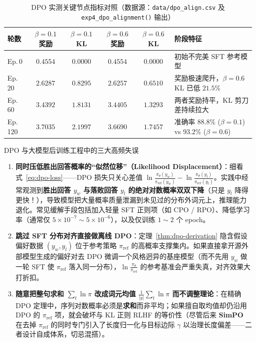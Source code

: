 \begin{table}[htbp]
\centering
\caption{DPO 实测关键节点指标对照（数据源：\texttt{data/dpo\_align.csv} 及 \texttt{exp4\_dpo\_alignment()} 输出）}
\label{tab:dpo-metrics}
\footnotesize
\begin{tabularx}{\linewidth}{@{}lccccX@{}}
\toprule
\textbf{轮数} & \textbf{$\beta{=}0.1$ 奖励} & \textbf{$\beta{=}0.1$ KL} & \textbf{$\beta{=}0.6$ 奖励} & \textbf{$\beta{=}0.6$ KL} & \textbf{阶段特征} \\
\midrule
Ep.\,0   & $0.4554$ & $0.0000$ & $0.4554$ & $0.0000$ & 初始不完美 SFT 参考模型 \\
Ep.\,20  & $2.6287$ & $0.8295$ & $2.6257$ & $0.6510$ & 奖励极速爬升，$\beta{=}0.6$ KL 已低 $21.5\%$ \\
Ep.\,60  & $3.4392$ & $1.8131$ & $3.4405$ & $1.3293$ & 两者奖励持平，KL 剪刀差持续拉大 \\
Ep.\,120 & $3.7035$ & $2.1997$ & $3.6690$ & $1.7457$ & 准确率 $88.8\%$ ($\beta{=}0.1$) vs $93.2\%$ ($\beta{=}0.6$) \\
\bottomrule
\end{tabularx}
\end{table}

\begin{failBox}{DPO 与大模型后训练工程中的三大高频失误}
\begin{enumerate}
  \item \textbf{同时压低胜出回答概率的“似然位移”（Likelihood Displacement）}：细看式~\eqref{eq:dpo-loss}——DPO 损失只关心差值 $\ln\frac{\pi_\theta(y_w)}{\pi_{\mathrm{ref}}(y_w)} - \ln\frac{\pi_\theta(y_l)}{\pi_{\mathrm{ref}}(y_l)}$。实践中经常观测到\textbf{胜出回答 $y_w$ 与落败回答 $y_l$ 的绝对对数概率双双下降}（只是 $y_l$ 降得更快！），导致模型把大量概率质量泄漏到未见过的分布外词元上，推理能力退化。常见缓解手段包括加入轻量 SFT 正则项（如 CPO / RPO）、降低学习率（通常仅 $5\times 10^{-7} \sim 5\times 10^{-6}$），以及仅训练 $1 \sim 2$ 个 epoch。
  \item \textbf{跳过 SFT 分布对齐直接做离线 DPO}：定理~\ref{thm:dpo-derivation} 隐含假设偏好数据 $(y_w, y_l)$ 位于参考策略 $\pi_{\mathrm{ref}}$ 的高概率支撑集内。如果直接拿开源外部模型生成的偏好对去 DPO 微调一个风格迥异的基座模型（而不先用 $y_w$ 做一轮 SFT 使 $\pi_{\mathrm{ref}}$ 落入同一分布），$\ln\frac{\pi_\theta}{\pi_{\mathrm{ref}}}$ 的参考基准会严重失真，对齐效果大打折扣。
  \item \textbf{随意把整句求和 $\sum_t \ln \pi$ 改成词元均值 $\frac{1}{|y|}\sum_t \ln \pi$ 而不调整理论}：在精确 DPO 定理中，序列对数概率必须是\textbf{求和}而非平均；如果擅自取均值却仍沿用 DPO 的 $\pi_{\mathrm{ref}}$ 项，就会破坏与 KL 正则 RLHF 的等价性（尽管后来 \textbf{SimPO} 在去掉 $\pi_{\mathrm{ref}}$ 的同时专门引入了长度归一化与目标边际 $\gamma$ 以治理长度偏差——二者设计自成体系，切忌混搭）。
\end{enumerate}
\end{failBox}

